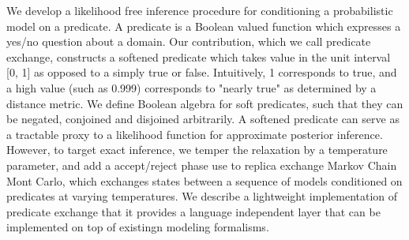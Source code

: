 We develop a likelihood free inference procedure for conditioning a probabilistic model on a predicate.
A predicate is a Boolean valued function which expresses a yes/no question about a domain.
Our contribution, which we call predicate exchange, 
constructs a softened predicate which takes value in the unit interval [0, 1] as opposed to a simply true or false. Intuitively, 1 corresponds to true, and a high value (such as 0.999) corresponds to "nearly true" as determined by a distance metric.
We define Boolean algebra for soft predicates,  such that they can be negated, conjoined and disjoined arbitrarily.
A softened predicate can serve as a tractable proxy to a likelihood function for approximate posterior inference.
However, to target exact inference, we temper the relaxation by a temperature parameter, and add a accept/reject phase use to replica exchange Markov Chain Mont Carlo, which exchanges states between a sequence of models conditioned on predicates at varying temperatures.
We describe a lightweight implementation of predicate exchange that it provides a language independent layer that can be implemented on top of existingn modeling formalisms.